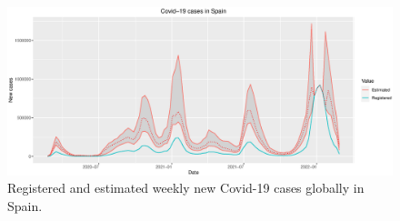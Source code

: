 \documentclass[twoside]{report}
\begin{document}
\begin{figure}[!ht]\centering
\includegraphics[width=12cm]{morinafig2}
\caption{\label{morina:fig2} Registered and estimated weekly new Covid-19 cases globally in Spain.}
\end{figure}


\end{document}
